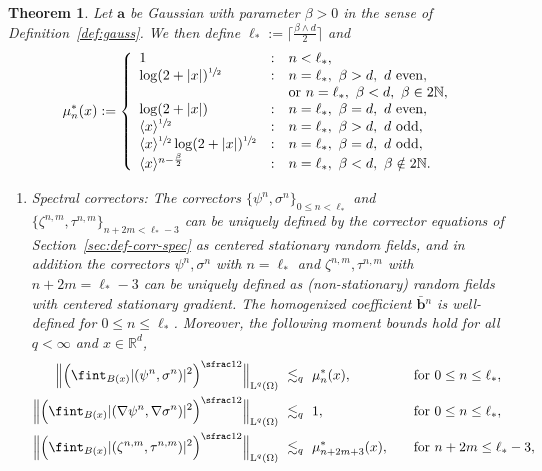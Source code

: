 \documentclass[10pt]{amsart}
\newenvironment{enumeratei}
{\bgroup\def\theenumi{\roman{enumi}}\def\theenumii{\arabic{enumii}}\begin{enumerate}}
{\end{enumerate}\egroup}
\theoremstyle{plain}
\newtheorem{theor0}{Theorem}[section]
\newenvironment{theor}
{\renewcommand{\qedsymbol}{$\lozenge$}\pushQED{\qed}\begin{theor0}}
{\popQED\end{theor0}}
\theoremstyle{definition}
\numberwithin{equation}{section}
\newcommand{\N}{\mathbb N}
\newcommand{\R}{\mathbb R}
\newcommand{\Aa}{\boldsymbol a}
\newcommand{\bb}{{\boldsymbol b}}
\newcommand{\Ld}{\operatorname{L}}
\begin{document}
\begin{theor}\label{th:corr-bounds}
Let $\Aa$ be Gaussian with parameter $\beta>0$ in the sense of Definition~\ref{def:gauss}.
We then define $\ell_*:=\lceil\tfrac{\beta\wedge d}2\rceil$ and\vspace*{-3pt}
\begin{equation}\label{eq:mun-*}
\mu_n^*(x):=\left\{\begin{array}{lll}
1&:&n<\ell_*,\\
\log(2+|x|)^{\sfrac12}&:&n=\ell_*,~\beta>d,~\text{$d$ even},\\
&&\text{or }n=\ell_*,~\beta<d,~\beta \in 2\N,\\
\log(2+|x|)&:&n=\ell_*,~\beta=d,~\text{$d$ even},\\
\langle x\rangle^{\sfrac12}&:&n=\ell_*,~\beta>d,~\text{$d$ odd},\\
\langle x\rangle^{\sfrac12}\log(2+|x|)^{\sfrac12}&:&n=\ell_*,~\beta = d,~\text{$d$ odd},\\
\langle x\rangle^{n-\frac\beta2}&:&n=\ell_*,~\beta<d,~\beta \notin 2\N.
\end{array}\right.
\end{equation}
\begin{enumeratei}
\item\emph{Spectral correctors:}
The correctors $\{\psi^n,\sigma^n\}_{0\le n< \ell_*}$ and $\{\zeta^{n,m},\tau^{n,m}\}_{n+2m<\ell_*-3}$ can be uniquely defined by the corrector equations of Section~\ref{sec:def-corr-spec} as centered stationary random fields, and in addition the correctors $\psi^n,\sigma^n$ with $n=\ell_*$ and $\zeta^{n,m},\tau^{n,m}$ with $n+2m=\ell_*-3$ can be uniquely defined as (non-stationary) random fields with centered stationary gradient.
The homogenized coefficient $\bar\bb{}^n$ is well-defined for $0\le n\le \ell_*$.
Moreover, the following moment bounds hold for all $q<\infty$ and $x\in\R^d$,\vspace*{-3pt}
\[\begin{aligned}
\Big\|\Big(\fint_{B(x)}|(\psi^n,\sigma^n)|^2\Big)^{\sfrac12}\Big\|_{\Ld^q(\Omega)}&~\lesssim_q~\mu_n^*(x),\quad&&\text{for $0\le n\le \ell_*$},\\
\Big\|\Big(\fint_{B(x)}|(\nabla\psi^n,\nabla\sigma^n)|^2\Big)^{\sfrac12}\Big\|_{\Ld^q(\Omega)}&~\lesssim_q~1,\quad&&\text{for $0\le n\le \ell_*$},\\
\Big\|\Big(\fint_{B(x)}|(\zeta^{n,m},\tau^{n,m})|^2\Big)^{\sfrac12}\Big\|_{\Ld^q(\Omega)}&~\lesssim_q~\mu^*_{n+2m+3}(x),\quad&&\text{for $n+2m\le \ell_*-3$},\\

\end{aligned}\]
\end{enumeratei}
\end{theor}
\end{document}
